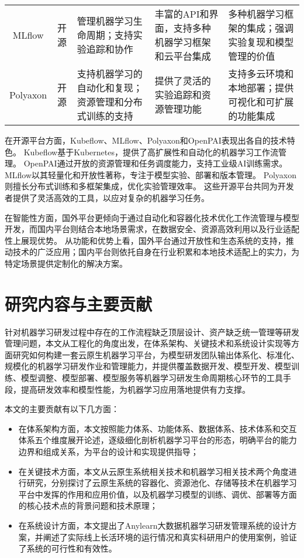 \begin{landscape}
\begin{table}[ht]
\begin{tabularx}{\linewidth}{ccXXX}
    MLflow & 开源 & 管理机器学习生命周期；支持实验追踪和协作 & 丰富的API和界面，支持多种机器学习框架和云平台集成 & 多种机器学习框架的集成；强调实验复现和模型管理的价值 \\
    Polyaxon & 开源 & 支持机器学习的自动化和复现；资源管理和分布式训练的支持 & 提供了灵活的实验追踪和资源管理功能 & 支持多云环境和本地部署；提供可视化和可扩展的功能集成 \\
    \bottomrule
    \end{tabularx}
    \label{tab:platforms}
  \end{table}
\end{landscape}

在开源平台方面，Kubeflow、MLflow、Polyaxon和OpenPAI表现出各自的技术特色。
Kubeflow基于Kubernetes，提供了高扩展性和自动化的机器学习工作流管理。
OpenPAI通过开放的资源管理和任务调度能力，支持工业级AI训练需求。
MLflow以其轻量化和开放性著称，专注于模型实验、部署和版本管理。
Polyaxon则擅长分布式训练和多框架集成，优化实验管理效率。
这些开源平台共同为开发者提供了灵活高效的工具，以应对复杂的机器学习任务。

在智能性方面，国外平台更倾向于通过自动化和容器化技术优化工作流管理与模型开发，而国内平台则结合本地场景需求，在数据安全、资源高效利用以及行业适配性上展现优势。
从功能和优势上看，国外平台通过开放性和生态系统的支持，推动技术的广泛应用；国内平台则依托自身在行业积累和本地技术适配上的实力，为特定场景提供定制化的解决方案。


%
\section{研究内容与主要贡献}

针对机器学习研发过程中存在的工作流程缺乏顶层设计、资产缺乏统一管理等研发管理问题，本文从工程化的角度出发，在体系架构、关键技术和系统设计实现等方面研究如何构建一套云原生机器学习平台，为模型研发团队输出体系化、标准化、规模化的机器学习研发作业和管理能力，并提供覆盖数据开发、模型开发、模型训练、模型调整、模型部署、模型服务等机器学习研发生命周期核心环节的工具手段，提高研发效率和模型性能，为机器学习应用落地提供有力支撑。

本文的主要贡献有以下几方面：
\begin{itemize}
  \item 在体系架构方面，本文按照能力体系、功能体系、数据体系、技术体系和交互体系五个维度展开论述，逐级细化剖析机器学习平台的形态，明确平台的能力边界和组成关系，为平台的设计和实现提供指导；
  \item 在关键技术方面，本文从云原生系统相关技术和机器学习相关技术两个角度进行研究，分别探讨了云原生系统的容器化、资源池化、存储等技术在机器学习平台中发挥的作用和应用价值，以及机器学习模型的训练、调优、部署等方面的核心技术点的背景问题和技术原理；
  \item 在系统设计方面，本文提出了Anylearn大数据机器学习研发管理系统的设计方案，并阐述了实际线上长活环境的运行情况和真实科研用户的使用案例，验证了系统的可行性和有效性。
\end{itemize}


